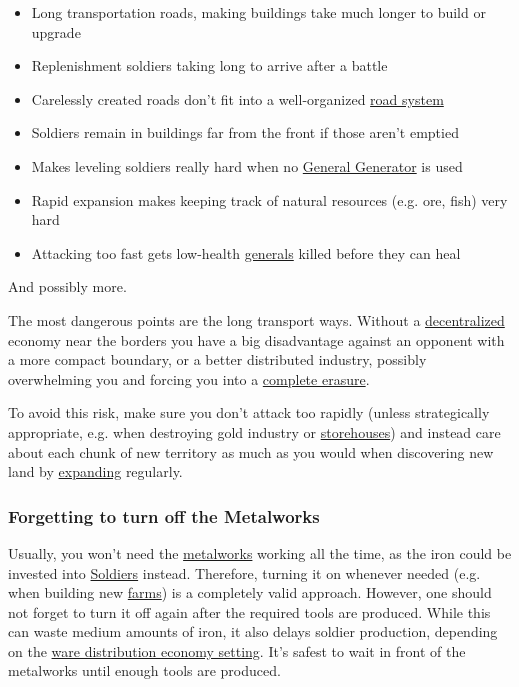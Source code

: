 \documentclass[12pt]{article}
\begin{document}
\begin{itemize}
    \item Long transportation roads, making buildings take much longer to build or upgrade
    \item Replenishment soldiers taking long to arrive after a battle
    \item Carelessly created roads don't fit into a well-organized \hyperref[sec:roadsystem]{road system}
    \item Soldiers remain in buildings far from the front if those aren't emptied
    \item Makes leveling soldiers really hard when no \hyperref[sec:generalgenerator]{General Generator} is used
    \item Rapid expansion makes keeping track of natural resources (e.g. ore, fish) very hard
    \item Attacking too fast gets low-health \hyperref[sec:general]{generals} killed before they can heal
\end{itemize}

And possibly more.

The most dangerous points are the long transport ways. Without a \hyperref[sec:decentralization]{decentralized} economy near the borders you have a big disadvantage against an opponent with a more compact boundary, or a better distributed industry, possibly overwhelming you and forcing you into a \hyperref[sec:completeerasure]{complete erasure}.

To avoid this risk, make sure you don't attack too rapidly (unless strategically appropriate, e.g. when destroying gold industry or \hyperref[sec:storehouse]{storehouses}) and instead care about each chunk of new territory as much as you would when discovering new land by \hyperref[sec:expanding]{expanding} regularly.

\subsubsection{Forgetting to turn off the Metalworks}
\label{sec:forgettingmetalworks}

Usually, you won't need the \hyperref[sec:metalworks]{metalworks} working all the time, as the iron could be invested into \hyperref[sec:soldiers]{Soldiers} instead. Therefore, turning it on whenever needed (e.g. when building new \hyperref[sec:farm]{farms}) is a completely valid approach. However, one should not forget to turn it off again after the required tools are produced. While this can waste medium amounts of iron, it also delays soldier production, depending on the \hyperref[sec:waredistribution]{ware distribution economy setting}. It's safest to wait in front of the metalworks until enough tools are produced.
\end{document}
